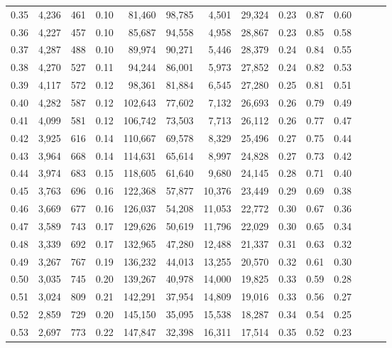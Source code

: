 \begin{tabular}{rrrrrrrrrrrrrr}
0.35 &  4,236 &  461 &  0.10 &   81,460 &   98,785 &   4,501 &  29,324 &  0.23 &  0.87 &      0.60 \\
0.36 &  4,227 &  457 &  0.10 &   85,687 &   94,558 &   4,958 &  28,867 &  0.23 &  0.85 &      0.58 \\
0.37 &  4,287 &  488 &  0.10 &   89,974 &   90,271 &   5,446 &  28,379 &  0.24 &  0.84 &      0.55 \\
0.38 &  4,270 &  527 &  0.11 &   94,244 &   86,001 &   5,973 &  27,852 &  0.24 &  0.82 &      0.53 \\
0.39 &  4,117 &  572 &  0.12 &   98,361 &   81,884 &   6,545 &  27,280 &  0.25 &  0.81 &      0.51 \\
0.40 &  4,282 &  587 &  0.12 &  102,643 &   77,602 &   7,132 &  26,693 &  0.26 &  0.79 &      0.49 \\
0.41 &  4,099 &  581 &  0.12 &  106,742 &   73,503 &   7,713 &  26,112 &  0.26 &  0.77 &      0.47 \\
0.42 &  3,925 &  616 &  0.14 &  110,667 &   69,578 &   8,329 &  25,496 &  0.27 &  0.75 &      0.44 \\
0.43 &  3,964 &  668 &  0.14 &  114,631 &   65,614 &   8,997 &  24,828 &  0.27 &  0.73 &      0.42 \\
0.44 &  3,974 &  683 &  0.15 &  118,605 &   61,640 &   9,680 &  24,145 &  0.28 &  0.71 &      0.40 \\
0.45 &  3,763 &  696 &  0.16 &  122,368 &   57,877 &  10,376 &  23,449 &  0.29 &  0.69 &      0.38 \\
0.46 &  3,669 &  677 &  0.16 &  126,037 &   54,208 &  11,053 &  22,772 &  0.30 &  0.67 &      0.36 \\
0.47 &  3,589 &  743 &  0.17 &  129,626 &   50,619 &  11,796 &  22,029 &  0.30 &  0.65 &      0.34 \\
0.48 &  3,339 &  692 &  0.17 &  132,965 &   47,280 &  12,488 &  21,337 &  0.31 &  0.63 &      0.32 \\
0.49 &  3,267 &  767 &  0.19 &  136,232 &   44,013 &  13,255 &  20,570 &  0.32 &  0.61 &      0.30 \\
0.50 &  3,035 &  745 &  0.20 &  139,267 &   40,978 &  14,000 &  19,825 &  0.33 &  0.59 &      0.28 \\
0.51 &  3,024 &  809 &  0.21 &  142,291 &   37,954 &  14,809 &  19,016 &  0.33 &  0.56 &      0.27 \\
0.52 &  2,859 &  729 &  0.20 &  145,150 &   35,095 &  15,538 &  18,287 &  0.34 &  0.54 &      0.25 \\
0.53 &  2,697 &  773 &  0.22 &  147,847 &   32,398 &  16,311 &  17,514 &  0.35 &  0.52 &      0.23 \\

\end{tabular}
